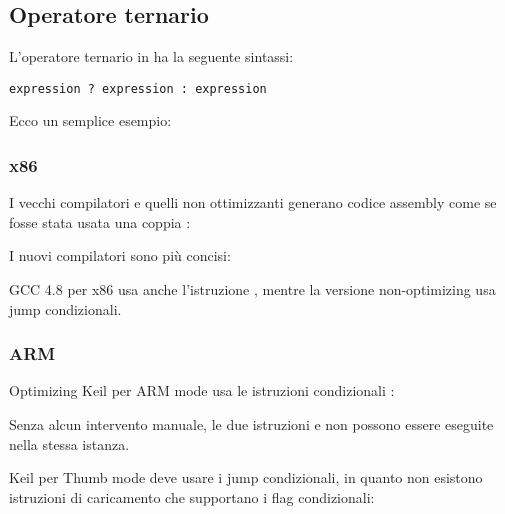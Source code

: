 \subsection{Operatore ternario}
\label{chap:cond}

L'operatore ternario in \CCpp ha la seguente sintassi:

\begin{lstlisting}
expression ? expression : expression
\end{lstlisting}

Ecco un semplice esempio:



\subsubsection{x86}

I vecchi compilatori e quelli non ottimizzanti generano codice assembly come se fosse stata usata una coppia :





I nuovi compilatori sono più concisi:



\Optimizing GCC 4.8 per x86 usa anche l'istruzione , mentre la versione non-optimizing usa jump condizionali.

\subsubsection{ARM}

\Anche Optimizing Keil per ARM mode usa le istruzioni condizionali :



Senza alcun intervento manuale, le due istruzioni  e  non possono essere eseguite nella stessa istanza.

\Optimizing Keil per Thumb mode deve usare i jump condizionali, in quanto non esistono istruzioni di caricamento che supportano i flag condizionali:

